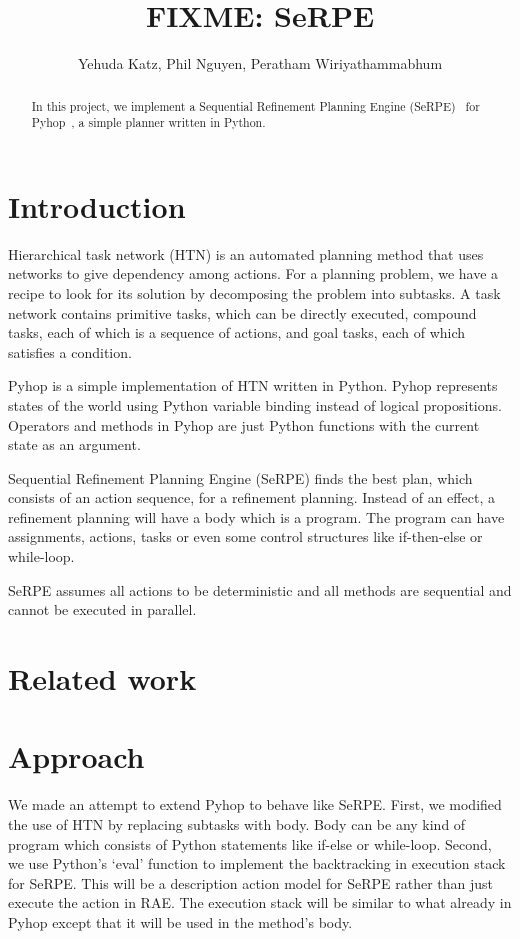 \documentclass[11pt]{article} %
\title{FIXME: SeRPE}
\author{Yehuda Katz, Phil Nguyen, Peratham Wiriyathammabhum}
\begin{document}
\maketitle

\begin{abstract}
In this project, we implement a Sequential Refinement Planning Engine
(SeRPE)~\cite{disgusting-draft} for Pyhop~\cite{pyhop},
a simple planner written in Python.
\end{abstract}

\section{Introduction}

Hierarchical task network (HTN) is an automated planning method that uses networks
to give dependency among actions.
For a planning problem, we have a recipe to look for its solution
by decomposing the problem into subtasks.
A task network contains primitive tasks, which can be directly executed,
compound tasks, each of which is a sequence of actions,
and goal tasks, each of which satisfies a condition.

Pyhop is a simple implementation of HTN written in Python. 
Pyhop represents states of the world using Python variable binding
 instead of logical propositions. Operators and methods in Pyhop are
 just Python functions with the current state as an argument.

Sequential Refinement Planning Engine (SeRPE) finds the best plan,
 which consists of an action sequence, for a refinement planning. 
Instead of an effect, a refinement planning will have a body which
 is a program. The program can have assignments, actions, tasks or
 even some control structures like if-then-else or while-loop.

SeRPE assumes all actions to be deterministic and all methods are 
sequential and cannot be executed in parallel.

\section{Related work}

\section{Approach}
We made an attempt to extend Pyhop to behave like SeRPE. 
First, we modified the use of HTN by replacing subtasks with 
body. Body can be any kind of program which consists of
 Python statements like if-else or while-loop.
Second, we use Python's `eval' function to implement the 
backtracking in execution stack for SeRPE. This will be a 
description action model for SeRPE rather than just execute
 the action in RAE. The execution stack will be similar to what
 already in Pyhop except that it will be used in the method's body.
\end{document}
